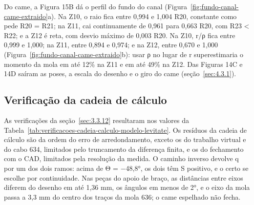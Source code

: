 Do came, a Figura 15B dá o perfil do fundo do canal (Figura~\ref{fig:fundo-canal-came-extraido}a). Na Z10, o raio fica entre 0,994 e 1,004 R20, constante como pede R20 = R21; na Z11, cai continuamente de 0,961 para 0,663 R20, com R23 < R22; e a Z12 é reta, com desvio máximo de 0,003 R20. Na Z10, r/ρ fica entre 0,999 e 1,000; na Z11, entre 0,894 e 0,974; e na Z12, entre 0,670 e 1,000 (Figura~\ref{fig:fundo-canal-came-extraido}b): usar ρ no lugar de r superestimaria o momento da mola em até 12\% na Z11 e em até 49\% na Z12. Das Figuras 14C e 14D saíram as poses, a escala do desenho e o giro do came (seção~\ref{sec:4.3.1}).

\subsection{Verificação da cadeia de cálculo}\label{sec:4.3.3}

As verificações da seção~\ref{sec:3.3.12} resultaram nos valores da Tabela~\ref{tab:verificacoes-cadeia-calculo-modelo-levitate}. Os resíduos da cadeia de cálculo são da ordem do erro de arredondamento, exceto os do trabalho virtual e do cabo 634, limitados pelo truncamento da diferença finita, e os do fechamento com o CAD, limitados pela resolução da medida. O caminho inverso devolve q por um dos dois ramos: acima de Θ = −48,8°, os dois têm S positivo, e o certo se escolhe por continuidade. Nas peças do apoio de braço, as distâncias entre eixos diferem do desenho em até 1,36 mm, os ângulos em menos de 2°, e o eixo da mola passa a 3,3 mm do centro dos traços da mola 636; o came espelhado não fecha.

